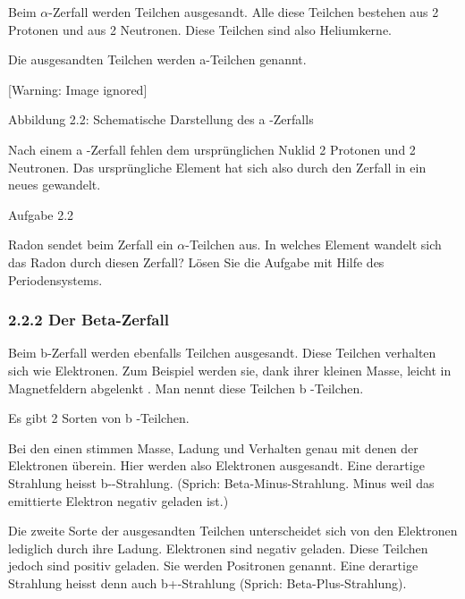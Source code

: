 \documentclass[12pt,a4paper,twoside]{article}
\begin{document}
Beim ${\alpha}$\nobreakdash-Zerfall werden Teilchen ausgesandt. Alle diese Teilchen bestehen aus 2 Protonen und aus 2 Neutronen. Diese Teilchen sind also Heliumkerne.

Die ausgesandten Teilchen werden \textgreek{a}\nobreakdash-Teilchen genannt.

  [Warning: Image ignored] %
 

Abbildung 2.2: Schematische Darstellung des \textgreek{a} \nobreakdash-Zerfalls

Nach einem \textgreek{a} \nobreakdash-Zerfall fehlen dem ursprünglichen Nuklid 2 Protonen und 2 Neutronen. Das ursprüngliche Element hat sich also durch den Zerfall in ein neues gewandelt.

Aufgabe 2.2

Radon sendet beim Zerfall ein ${\alpha}$\nobreakdash-Teilchen aus. In welches Element wandelt sich das Radon durch diesen Zerfall? Lösen Sie die Aufgabe mit Hilfe des Periodensystems.


\bigskip


\bigskip

\subsubsection{2.2.2 Der Beta\nobreakdash-Zerfall}

\bigskip

Beim b\nobreakdash-Zerfall werden ebenfalls Teilchen ausgesandt. Diese Teilchen verhalten sich wie Elektronen. Zum Beispiel werden sie, dank ihrer kleinen Masse, leicht in Magnetfeldern abgelenkt . Man nennt diese Teilchen \textgreek{b} \nobreakdash-Teilchen.

Es gibt 2 Sorten von \textgreek{b} \nobreakdash-Teilchen.

Bei den einen stimmen Masse, Ladung und Verhalten genau mit denen der Elektronen überein. Hier werden also Elektronen ausgesandt. Eine derartige Strahlung heisst \textgreek{b}\nobreakdash-\nobreakdash-Strahlung. (Sprich: {\quotedblbase}Beta\nobreakdash-Minus-Strahlung{\quotedblbase}. Minus weil das emittierte Elektron negativ geladen ist.)

Die zweite Sorte der ausgesandten Teilchen unterscheidet sich von den Elektronen lediglich durch ihre Ladung. Elektronen sind negativ geladen. Diese Teilchen jedoch sind positiv geladen. Sie werden Positronen genannt. Eine derartige Strahlung heisst denn auch \textgreek{b}+\nobreakdash-Strahlung (Sprich: {\quotedblbase}Beta\nobreakdash-Plus-Strahlung{\quotedblbase}).
\end{document}

